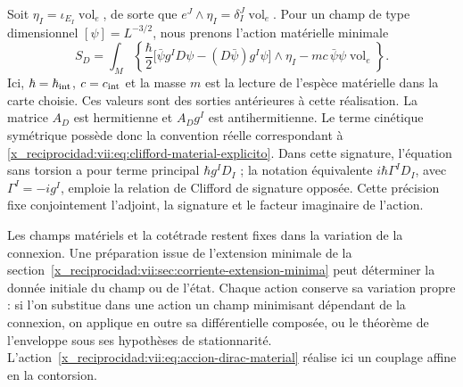 Soit \(\eta_I=\iota_{E_I}\operatorname{vol}_e\), de sorte que \(e^J\wedge\eta_I=\delta_I^J\operatorname{vol}_e\). Pour un champ de type dimensionnel \([\psi]=L^{-3/2}\), nous prenons l'action matérielle minimale
\begin{equation}
 S_D=\int_M\left\{
 \frac{\hbar}{2}
 \bigl[\bar\psi g^I D\psi-(D\bar\psi)g^I\psi\bigr]\wedge\eta_I
 -mc\,\bar\psi\psi\operatorname{vol}_e\right\}.
 \label{x_reciprocidad:vii:eq:accion-dirac-material}
\end{equation}
Ici, \(\hbar=\hbar_{\rm int}\), \(c=c_{\rm int}\) et la masse \(m\) est la lecture de l'espèce matérielle dans la carte choisie. Ces valeurs sont des sorties antérieures à cette réalisation. La matrice \(A_D\) est hermitienne et \(A_Dg^I\) est antihermitienne. Le terme cinétique symétrique possède donc la convention réelle correspondant à \eqref{x_reciprocidad:vii:eq:clifford-material-explicito}. Dans cette signature, l'équation sans torsion a pour terme principal \(\hbar g^I D_I\) ; la notation équivalente \(i\hbar\Gamma^I D_I\), avec \(\Gamma^I=-i g^I\), emploie la relation de Clifford de signature opposée. Cette précision fixe conjointement l'adjoint, la signature et le facteur imaginaire de l'action.

Les champs matériels et la cotétrade restent fixes dans la variation
de la connexion. Une préparation issue de l'extension minimale de
la section~\ref{x_reciprocidad:vii:sec:corriente-extension-minima} peut déterminer
la donnée initiale du champ ou de l'état. Chaque action conserve sa
variation propre : si l'on substitue dans une action un champ minimisant
dépendant de la connexion, on applique en outre sa différentielle composée,
ou le théorème de l'enveloppe sous ses hypothèses de stationnarité.
L'action~\eqref{x_reciprocidad:vii:eq:accion-dirac-material} réalise ici un
couplage affine en la contorsion.

